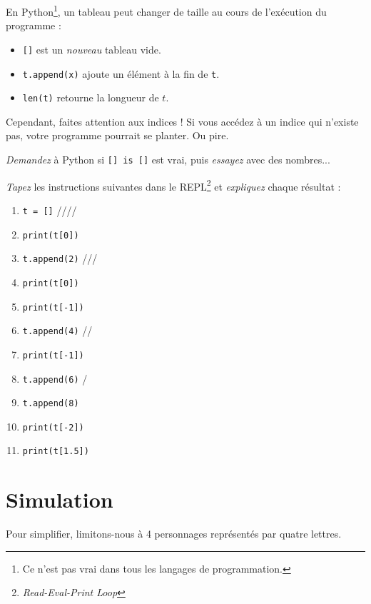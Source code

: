 En Python\footnote{Ce n'est pas vrai dans tous les langages de programmation.},
un tableau peut changer de taille au cours de l'exécution du programme :
\begin{itemize}
\item \texttt{[]} est un \emph{nouveau} tableau vide.
\item \texttt{t.append(x)} ajoute un élément à la fin de \texttt{t}.
\item \texttt{len(t)} retourne la longueur de $t$.
\end{itemize}
Cependant, faites attention aux indices ! Si vous accédez à un indice qui
n'existe pas, votre programme pourrait se planter. Ou pire.

\begin{exo}[Bonus]
\emph{Demandez} à Python si \texttt{[] is []} est vrai,
puis \emph{essayez} avec des nombres...
\end{exo}

\begin{exo}
\emph{Tapez} les instructions suivantes dans le
REPL\footnote{\emph{Read-Eval-Print Loop}} et
\emph{expliquez} chaque résultat :
\begin{enumerate}
	\item \texttt{t = []} 
		\hfill \boxes ////
	\item \texttt{print(t[0])} 
	\item \texttt{t.append(2)}
		\hfill {}///
	\item \texttt{print(t[0])} 
	\item \texttt{print(t[-1])} 
	\item \texttt{t.append(4)}
		\hfill {}//
	\item \texttt{print(t[-1])} 
	\item \texttt{t.append(6)}
		\hfill {}/
	\item \texttt{t.append(8)}
		\hfill {}
	\item \texttt{print(t[-2])} 
	\item \texttt{print(t[1.5])} 
\end{enumerate}
\end{exo}

\section{Simulation}
Pour simplifier, limitons-nous à 4 personnages
représentés par quatre lettres.

